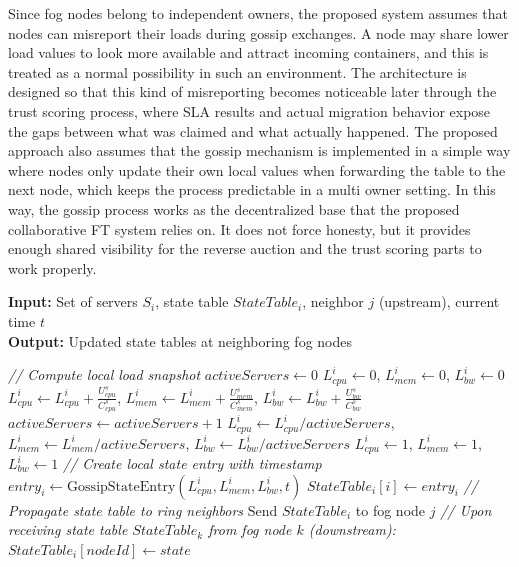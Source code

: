\documentclass{article}
\begin{document}
Since fog nodes belong to independent owners, the proposed system assumes that nodes can misreport their loads during gossip exchanges. A node may share lower load values to look more available and attract incoming containers, and this is treated as a normal possibility in such an environment. The architecture is designed so that this kind of misreporting becomes noticeable later through the trust scoring process, where SLA results and actual migration behavior expose the gaps between what was claimed and what actually happened. The proposed approach also assumes that the gossip mechanism is implemented in a simple way where nodes only update their own local values when forwarding the table to the next node, which keeps the process predictable in a multi owner setting. In this way, the gossip process works as the decentralized base that the proposed collaborative FT system relies on. It does not force honesty, but it provides enough shared visibility for the reverse auction and the trust scoring parts to work properly.

\begin{algorithm}[h!]
\caption{Gossip State Dissemination at Fog Node $i$}
\label{alg:gossip}
\textbf{Input:} Set of servers $S_i$, state table $StateTable_i$, neighbor $j$ (upstream), current time $t$ \\
\textbf{Output:} Updated state tables at neighboring fog nodes
\begin{algorithmic}[1]
\State \textit{// Compute local load snapshot}
\State $activeServers \gets 0$
\State $L^{i}_{cpu} \gets 0$, $L^{i}_{mem} \gets 0$, $L^{i}_{bw} \gets 0$
        \State $L^{i}_{cpu} \gets L^{i}_{cpu} + \frac{U^{s}_{cpu}}{C^{s}_{cpu}}$, $L^{i}_{mem} \gets L^{i}_{mem} + \frac{U^{s}_{mem}}{C^{s}_{mem}}$, $L^{i}_{bw} \gets L^{i}_{bw} + \frac{U^{s}_{bw}}{C^{s}_{bw}}$
        \State $activeServers \gets activeServers + 1$
    \EndIf
\EndFor
{}
    \State $L^{i}_{cpu} \gets L^{i}_{cpu} / activeServers$, $L^{i}_{mem} \gets L^{i}_{mem} / activeServers$, $L^{i}_{bw} \gets L^{i}_{bw} / activeServers$
\Else
    \State $L^{i}_{cpu} \gets 1$, $L^{i}_{mem} \gets 1$, $L^{i}_{bw} \gets 1$
\EndIf
\State
\State \textit{// Create local state entry with timestamp}
\State $entry_i \gets \text{GossipStateEntry}(L^{i}_{cpu}, L^{i}_{mem}, L^{i}_{bw}, t)$
\State $StateTable_i[i] \gets entry_i$
\State
\State \textit{// Propagate state table to ring neighbors}
    \State Send $StateTable_i$ to fog node $j$ 
\State
\State \textit{// Upon receiving state table $StateTable_k$ from fog node $k$ (downstream):}
        \State $StateTable_i[nodeId] \gets state$
    \EndIf
\EndFor
\end{algorithmic}
\end{algorithm}
\end{document}
